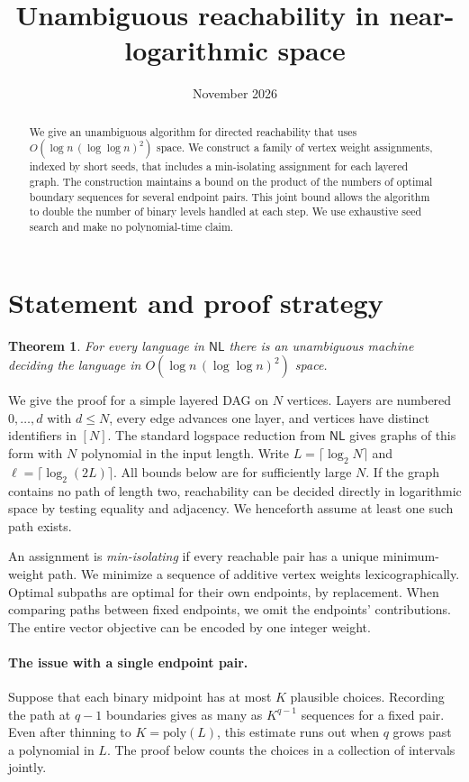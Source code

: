 \documentclass[11pt]{article}
\title{Unambiguous reachability in near-logarithmic space}
\author{}
\date{November 2026}
\newtheorem{theorem}{Theorem}
\newcommand{\NL}{\mathsf{NL}}
\begin{document}
\maketitle
\begin{abstract}
We give an unambiguous algorithm for directed reachability that uses
$O(\log n\,(\log\log n)^2)$ space. We construct a family of vertex weight assignments, indexed by short seeds,
that includes a min-isolating assignment for each layered graph.
The construction maintains a bound on the product of the numbers of optimal
boundary sequences for several endpoint pairs. This joint bound allows the
algorithm to double the number of binary levels handled at each step. We use
exhaustive seed search and make no polynomial-time claim.
\end{abstract}

\section{Statement and proof strategy}

\begin{theorem}\label{thm:main}
For every language in $\NL$ there is an unambiguous machine deciding the language
in $O(\log n\,(\log\log n)^2)$ space.
\end{theorem}

We give the proof for a simple layered DAG on $N$ vertices. Layers are numbered
$0,\ldots,d$ with $d\le N$, every edge advances one layer, and vertices have
distinct identifiers in $[N]$. The standard logspace reduction from $\NL$
gives graphs of this form with $N$ polynomial in the input length. Write
$L=\lceil\log_2 N\rceil$ and $\ell=\lceil\log_2(2L)\rceil$. All bounds below
are for sufficiently large $N$. If the graph contains no path of length two,
reachability can be decided directly in logarithmic space by testing equality
and adjacency. We henceforth assume at least one such path exists.

An assignment is \emph{min-isolating} if every reachable pair has a unique
minimum-weight path. We minimize a sequence of additive vertex weights
lexicographically. Optimal subpaths are optimal for their own endpoints,
by replacement. When comparing paths between fixed endpoints, we omit the
endpoints' contributions. The entire vector objective can be encoded by
one integer weight.

\paragraph{The issue with a single endpoint pair.}
Suppose that each binary midpoint has at most $K$ plausible choices.
Recording the path at $q-1$ boundaries gives as many as $K^{q-1}$
sequences for a fixed pair. Even after thinning to $K=\mathrm{poly}(L)$,
this estimate runs out when $q$ grows past a polynomial in $L$.
The proof below counts the choices in a collection of intervals jointly.
\end{document}
